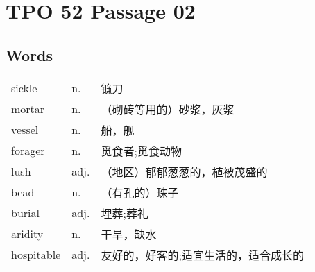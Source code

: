 \section{TPO 52 Passage 02}

\subsection{Words}

\begin{tabular}{lll}
    sickle     & n.   & 镰刀                  \\
    mortar     & n.   & （砌砖等用的）砂浆，灰浆        \\
    vessel     & n.   & 船，舰                 \\
    forager    & n.   & 觅食者;觅食动物            \\
    lush       & adj. & （地区）郁郁葱葱的，植被茂盛的     \\
    bead       & n.   & （有孔的）珠子             \\
    burial     & adj. & 埋葬;葬礼               \\
    aridity    & n.   & 干旱，缺水               \\
    hospitable & adj. & 友好的，好客的;适宜生活的，适合成长的 \\
\end{tabular}
